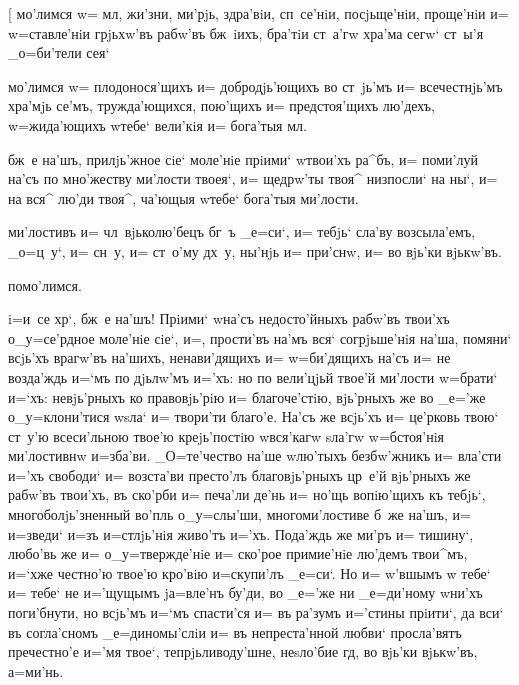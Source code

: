 
[ мо'лимся w= мл, жи'зни, ми'рjь, здра'вiи, 
сп~се'нiи, посjьще'нiи, проще'нiи и= w=ставле'нiи грjьхw'въ
рабw'въ бж~iихъ, бра'тiи ст~а'гw хра'ма сегw` \kinovarsimple{[и=ли`} 
ст~ы'я _о=би'тели сея`\kinovar{]}{.}

\laicos{\kinovarsimple{Ли'къ:} \kinovar{Г}{д\си} поми'луй, \kinovar{три'жды.}{]}}

 мо'лимся w= плодонося'щихъ и= добродjь'ющихъ во 
ст~jь'мъ и= всечестнjь'мъ хра'мjь се'мъ, тружда'ющихся, 
пою'щихъ и= предстоя'щихъ лю'дехъ, w=жида'ющихъ w\т тебе` 
вели'кiя и= бога'тыя мл.



 бж~е на'шъ, прилjь'жное сiе` моле'нiе прiими` 
w\т твои'хъ ра^бъ, и= поми'луй на'съ по мно'жеству 
ми'лости твоея`, и= щедрw'ты твоя^ низпосли` на ны`, и= 
на вся^ лю'ди твоя^, ча'ющыя w\т тебе` бога'тыя ми'лости.


 ми'лостивъ и= чл~вjьколю'бецъ бг~ъ _е=си`, и= 
тебjь` сла'ву возсыла'емъ, _о=ц~у`, и= сн~у, и= ст~о'му 
дх~у, ны'нjь и= при'снw, и= во вjь'ки вjькw'въ.



  помо'лимся.

 i=и~се хр`, бж~е на'шъ! Прiими` w\т на'съ 
недосто'йныхъ рабw'въ твои'хъ о_у=се'рдное моле'нiе сiе`, 
и=, прости'въ на'мъ вся` согрjьше'нiя на'ша, помяни` 
всjь'хъ врагw'въ на'шихъ, ненави'дящихъ и= w=би'дящихъ 
на'съ и= не возда'ждь и=`мъ по дjьлw'мъ и='хъ: но по 
вели'цjьй твое'й ми'лости w=брати` и=`хъ: невjь'рныхъ ко 
правовjь'рiю и= благоче'стiю, вjь'рныхъ же во _е='же 
о_у=клони'тися w\т sла` и= твори'ти благо'е. На'съ же 
всjь'хъ и= це'рковь твою` ст~у'ю всеси'льною твое'ю 
креjь'постiю w\т вся'кагw sла'гw w=бстоя'нiя ми'лостивнw 
и=зба'ви. _О=те'чество на'ше w\т лю'тыхъ безбw'жникъ и= 
вла'сти и='хъ свободи` \kinovarsimple{[}и= возста'ви престо'лъ 
благовjь'рныхъ цр~е'й\kinovarsimple{],} вjь'рныхъ же рабw'въ твои'хъ, 
въ ско'рби и= печа'ли де'нь и= но'щь вопiю'щихъ къ тебjь`, 
многоболjь'зненный во'пль о_у=слы'ши, многоми'лостиве б~же 
на'шъ, и= и=зведи` и=зъ и=стлjь'нiя живо'тъ и='хъ. 
Пода'ждь же ми'ръ и= тишину`, любо'вь же и= о_у=твержде'нiе 
и= ско'рое примие'нiе лю'демъ твои^мъ, и=`хже честно'ю 
твое'ю кро'вiю и=скупи'лъ _е=си`. Но и= w'вшымъ w\т 
тебе` и= тебе` не и='щущымъ jа=вле'нъ бу'ди, во _е='же ни 
_е=ди'ному w\т ни'хъ поги'бнути, но всjь'мъ и=`мъ спасти'ся 
и= въ ра'зумъ и='стины прiити`, да вси` въ согла'сномъ 
_е=диномы'слiи и= въ непреста'нной любви` просла'вятъ 
пречестно'е и='мя твое`, тепрjьливоду'шне, неsло'бие гд,
во вjь'ки вjькw'въ, а=ми'нь.


